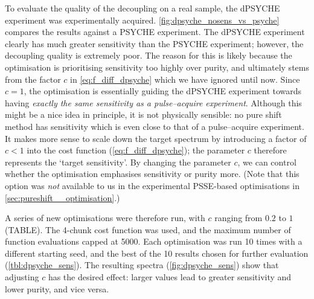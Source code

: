 To evaluate the quality of the decoupling on a real sample, the dPSYCHE experiment was experimentally acquired. \cref{fig:dpsyche_nosens_vs_psyche} compares the results against a PSYCHE experiment.
The dPSYCHE experiment clearly has much greater sensitivity than the PSYCHE experiment; however, the decoupling quality is extremely poor.
The reason for this is likely because the optimisation is prioritising sensitivity too highly over purity, and ultimately stems from the factor $c$ in \cref{eq:f_diff_dpsyche} which we have ignored until now.
Since $c = 1$, the optimisation is essentially guiding the dPSYCHE experiment towards having \textit{exactly the same sensitivity as a pulse--acquire experiment}.
Although this might be a nice idea in principle, it is not physically sensible: no pure shift method has sensitivity which is even close to that of a pulse--acquire experiment.
It makes more sense to scale down the target spectrum by introducing a factor of $c < 1$ into the cost function (\cref{eq:f_diff_dpsyche}); the parameter $c$ therefore represents the `target sensitivity'.
By changing the parameter $c$, we can control whether the optimisation emphasises sensitivity or purity more.
(Note that this option was \textit{not} available to us in the experimental PSSE-based optimisations in \cref{sec:pureshift__optimisation}.)

A series of new optimisations were therefore run, with $c$ ranging from $0.2$ to $1$ (TABLE).
The 4-chunk cost function was used, and the maximum number of function evaluations capped at 5000.
Each optimisation was run 10 times with a different starting seed, and the best of the 10 results chosen for further evaluation (\cref{tbl:dpsyche_sens}).
The resulting spectra (\cref{fig:dpsyche_sens}) show that adjusting $c$ has the desired effect: larger values lead to greater sensitivity and lower purity, and vice versa.

